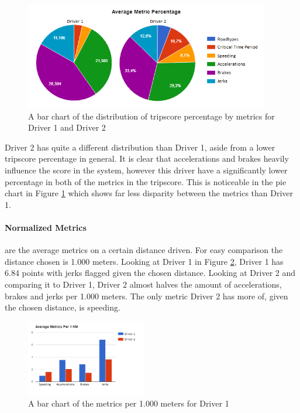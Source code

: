 \begin{figure}[tb]
\centering
\includegraphics[width=0.95\textwidth]{Pictures/piecharts}
\caption{A bar chart of the distribution of tripscore percentage by metrics for Driver 1 and Driver 2}
\label{fig:piecharts}
\end{figure}

Driver 2 has quite a different distribution than Driver 1, aside from a lower tripscore percentage in general. It is clear that accelerations and brakes heavily influence the score in the system, however this driver have a significantly lower percentage in both of the metrics in the tripscore. This is noticeable in the pie chart in Figure \ref{fig:piecharts} which shows far less disparity between the metrics than Driver 1.

\paragraph{Normalized Metrics} are the average metrics on a certain distance driven. For easy comparison the distance chosen is 1.000 meters. Looking at Driver 1 in Figure \ref{fig:avgmetricnorm}, Driver 1 has 6.84 points with jerks flagged given the chosen distance. Looking at Driver 2 and comparing it to Driver 1, Driver 2 almost halves the amount of accelerations, brakes and jerks per 1.000 meters. The only metric Driver 2 has more of, given the chosen distance, is speeding.

\begin{figure}[tb]
\centering
\includegraphics[width=0.465\textwidth]{Pictures/AverageMetricsNorm}
\caption{A bar chart of the metrics per 1.000 meters for Driver 1}
\label{fig:avgmetricnorm}
\end{figure}

